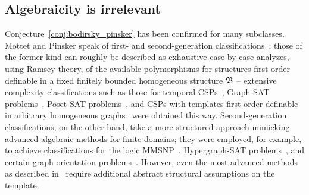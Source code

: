  

\subsection{Algebraicity is irrelevant} 
\label{section:introduction_no_alg}

 Conjecture~\ref{conj:bodirsky_pinsker} has been confirmed for many subclasses. Mottet and Pinsker speak of first- and second-generation classifications~\cite{mottet2024smooth}:
 those of the former kind  can  roughly be described as exhaustive case-by-case analyzes, using Ramsey theory, of the available polymorphisms for structures first-order definable in a fixed finitely bounded homogeneous structure $\mathfrak{B}$ -- extensive complexity classifications such as those for temporal CSPs~\cite{ComplOfTempCSPs}, Graph-SAT problems~\cite{BodPin-Schaefer-both}, Poset-SAT problems~\cite{posetCSP16}, and CSPs with templates first-order definable in arbitrary homogeneous graphs~\cite{BMPP16} were obtained this way.
 Second-generation classifications, on the other hand, take a more structured approach mimicking advanced algebraic methods for finite domains; they were  employed, for example,  to achieve classifications for the logic MMSNP~\cite{MMSNP-Journal}, Hypergraph-SAT problems~\cite{mottet_et_al:LIPIcs.ICALP.2024.148}, and certain graph orientation problems~\cite{feller2024algebraic,bitter2024completion}.
 However, even the most advanced methods as described in~\cite{mottet2024smooth}  require additional abstract  structural assumptions on the template. 

